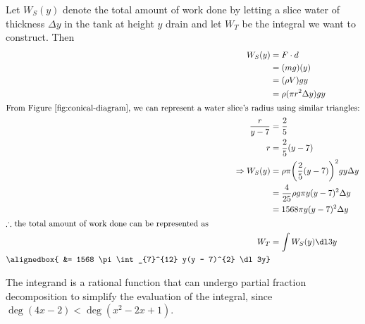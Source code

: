 \documentclass[
  coursecode={APSC 171},
  assignmentname={Week 9 Material Tutorial Solutions},
  solutiontitle=Solution,
  nodate,
  draft,
]{
  ltxanswer%
}
\begin{document}
\begin{questions}
\begin{solution}
      Let \(W_{S}(y)\) denote the total amount of work done by letting a slice water of thickness \(\Delta y\) in the tank at height \(y\) drain and let \(W_{T}\) be the integral we want to construct. Then
      \begin{align*}
        W_{S}(y)             &= F \cdot d                                                \\
                             &= (m g) (y)                                                \\
                             &= (\rho V) g y                                             \\
                             &= \rho (\pi r^{2} \Delta y) g y                            \\
        \intertext{From Figure~\ref{fig:conical-diagram}, we can represent a water slice's radius using similar triangles:}
        \frac{r}{y-7}        &= \frac{2}{5}                                              \\
        r                    &= \frac{2}{5} (y-7)                                        \\
        \Rightarrow W_{S}(y) &= \rho \pi \biggl(\frac{2}{5}(y-7)\biggr)^{2} g y \Delta y \\
                             &= \frac{4}{25} \rho g \pi y (y-7)^{2} \Delta y             \\
                             &= 1568 \pi y(y - 7)^{2} \Delta y                           \\
        \intertext{\(\therefore\) the total amount of work done can be represented as}
        W_{T}                &= \int W_{S} (y) \dl3y                                     \\
        \alignedbox{         &= 1568 \pi \int_{7}^{12} y(y - 7)^{2} \dl3y}
      \end{align*}
    \end{solution}

    \question{}
    \begin{solution}
      The integrand is a rational function that can undergo partial fraction decomposition to simplify the evaluation of the integral, since \(\deg(4x-2) < \deg(x^{2}-2x+1)\).


\end{solution}
\end{questions}
\end{document}

